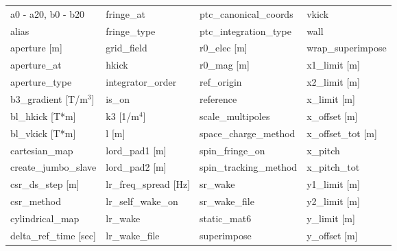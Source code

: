  \begin{tabular}{llll} \toprule
a0 - a20, b0 - b20               & fringe_at                        & ptc_canonical_coords             & vkick                            \\
alias                            & fringe_type                      & ptc_integration_type             & wall                             \\
aperture [m]                     & grid_field                       & r0_elec [m]                      & wrap_superimpose                 \\
aperture_at                      & hkick                            & r0_mag [m]                       & x1_limit [m]                     \\
aperture_type                    & integrator_order                 & ref_origin                       & x2_limit [m]                     \\
b3_gradient [T/m$^3$]            & is_on                            & reference                        & x_limit [m]                      \\
bl_hkick [T*m]                   & k3 [1/m$^4$]                     & scale_multipoles                 & x_offset [m]                     \\
bl_vkick [T*m]                   & l [m]                            & space_charge_method              & x_offset_tot [m]                 \\
cartesian_map                    & lord_pad1 [m]                    & spin_fringe_on                   & x_pitch                          \\
create_jumbo_slave               & lord_pad2 [m]                    & spin_tracking_method             & x_pitch_tot                      \\
csr_ds_step [m]                  & lr_freq_spread [Hz]              & sr_wake                          & y1_limit [m]                     \\
csr_method                       & lr_self_wake_on                  & sr_wake_file                     & y2_limit [m]                     \\
cylindrical_map                  & lr_wake                          & static_mat6                      & y_limit [m]                      \\
delta_ref_time [sec]             & lr_wake_file                     & superimpose                      & y_offset [m]                     \\

\end{tabular}
